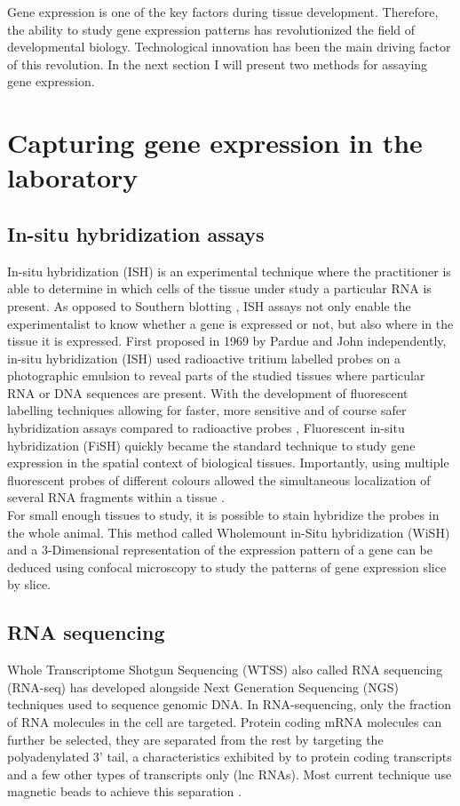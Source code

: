 	Gene expression is one of the key factors during tissue development. Therefore, the ability to study gene expression patterns has revolutionized the field of developmental biology. Technological innovation has been the main driving factor of this revolution. In the next section I will present two methods for assaying gene expression.


\section{Capturing gene expression in the laboratory}\label{sec:gene_expression_lab}
     \subsection{In-situ hybridization assays}
     In-situ hybridization (ISH) is an experimental technique where the practitioner is able to determine in which cells of the tissue under study a particular RNA is present. As opposed to Southern blotting \cite{southern75}, ISH assays not only enable the experimentalist to know whether a gene is expressed or not, but also where in the tissue it is expressed. First proposed in 1969 by Pardue \cite{pardue69} and John \cite{john69} independently, in-situ hybridization (ISH) used radioactive tritium labelled probes on a photographic emulsion to reveal parts of the studied tissues where particular RNA or DNA sequences are present. With the development of fluorescent labelling techniques \cite{landegent84,pinkel88} allowing for faster, more sensitive and of course safer hybridization assays compared to radioactive probes \cite{swiger96}, Fluorescent in-situ hybridization (FiSH) quickly became the standard technique to study gene expression in the spatial context of biological tissues. Importantly, using multiple fluorescent probes of different colours allowed the simultaneous localization of several RNA fragments within a tissue \cite{nederlof89}.\\
     
     For small enough tissues to study, it is possible to stain hybridize the probes in the whole animal. This method called Wholemount in-Situ hybridization (WiSH) and a 3-Dimensional representation of the expression pattern of a gene can be deduced using confocal microscopy to study the patterns of gene expression slice by slice.
     

     \subsection{RNA sequencing}
     Whole Transcriptome Shotgun Sequencing (WTSS) also called RNA sequencing (RNA-seq) \cite{morin08,wang09} has developed alongside Next Generation Sequencing (NGS) techniques used to sequence genomic DNA. In RNA-sequencing, only the fraction of RNA molecules in the cell are targeted. Protein coding mRNA molecules can further be selected, they are separated from the rest by targeting the polyadenylated 3' tail, a characteristics exhibited by to protein coding transcripts and a few other types of transcripts only (lnc RNAs). Most current technique use magnetic beads to achieve this separation \cite{mortazavi08,morin08}.\\
     
